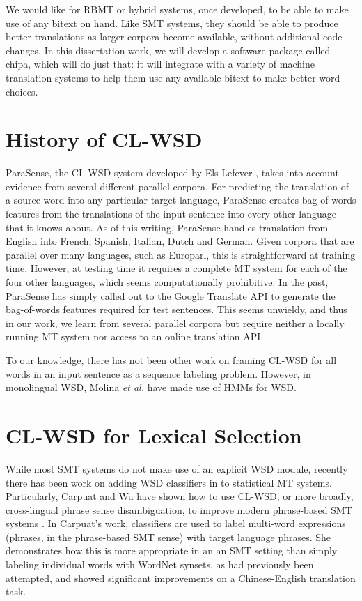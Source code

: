 We would like for RBMT or hybrid systems, once developed, to be able to make
use of any bitext on hand.  Like SMT systems, they should be able to produce
better translations as larger corpora become available, without additional code
changes.
In this dissertation work, we will develop a software package called
chipa, which will do just that: %
it will integrate with a variety of machine translation systems to help them
use any available bitext to make better word choices.







\section{History of CL-WSD}


ParaSense, the CL-WSD system developed by Els Lefever
\cite{lefever-hoste-decock:2011:ACL-HLT2011}, takes into account evidence from
several different parallel corpora.
For predicting the translation of a source word into
any particular target language, ParaSense creates
bag-of-words features from the translations of the input sentence into every
other language that it knows about. As of this writing, ParaSense handles
translation from English into French, Spanish, Italian, Dutch and German.
Given corpora that are parallel over many languages, such as Europarl, this is
straightforward at
training time. However, at testing time it requires a complete MT system for
each of the four other languages, which seems computationally prohibitive. In
the past, ParaSense has simply called out to the Google Translate API to
generate the bag-of-words features required for test sentences. This seems
unwieldy, and thus in our work, we learn from several parallel corpora but
require neither a locally running MT system nor access to an online translation
API.

To our knowledge, there has not been other work on framing CL-WSD for all words
in an input sentence as a sequence labeling problem. However, in monolingual
WSD, Molina \textit{et al.} \cite{DBLP:conf/iberamia/MolinaPS02} have made
use of HMMs for WSD. 


\section{CL-WSD for Lexical Selection}
While most SMT systems do not make use of an explicit WSD module, recently
there has been work on adding WSD classifiers in to statistical MT systems.
Particularly, Carpuat and Wu have shown how to use CL-WSD, or more broadly,
cross-lingual phrase sense disambiguation, to improve modern phrase-based SMT
systems
\cite{carpuatpsd,carpuat-wu:2007:EMNLP-CoNLL2007,carpuat2008evaluation}. In
Carpuat's work, classifiers are used to label multi-word expressions (phrases,
in the phrase-based SMT sense) with target language phrases. She demonstrates
how this is more appropriate in an an SMT setting than simply labeling
individual words with WordNet synsets, as had previously been attempted, and
showed significant improvements on a Chinese-English translation task.

